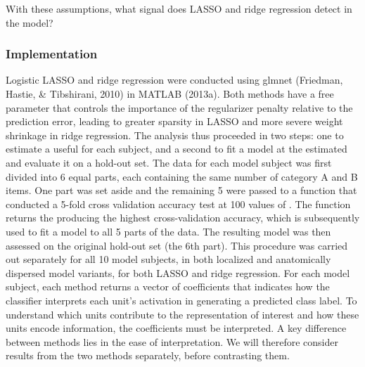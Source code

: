 With these assumptions, what signal does LASSO and ridge regression detect in the model?

\subsubsection{Implementation}
Logistic LASSO and ridge regression were conducted using glmnet (Friedman, Hastie, & Tibshirani, 2010) in MATLAB (2013a). Both methods have a free parameter \lambda that controls the importance of the regularizer penalty relative to the prediction error, leading to greater sparsity in LASSO and more severe weight shrinkage in ridge regression. The analysis thus proceeded in two steps: one to estimate a useful \lambda for each subject, and a second to fit a model at the estimated \lambda and evaluate it on a hold-out set. The data for each model subject was first divided into 6 equal parts, each containing the same number of category A and B items. One part was set aside and the remaining 5 were passed to a function that conducted a 5-fold cross validation accuracy test at 100 values of \lambda. The function returns the \lambda producing the highest cross-validation accuracy, which is subsequently used to fit a model to all 5 parts of the data. The resulting model was then assessed on the original hold-out set (the 6th part). This procedure was carried out separately for all 10 model subjects, in both localized and anatomically dispersed model variants, for both LASSO and ridge regression. For each model subject, each method returns a vector of coefficients that indicates how the classifier interprets each unit's activation in generating a predicted class label. To understand which units contribute to the representation of interest and how these units encode information, the coefficients must be interpreted. A key difference between methods lies in the ease of interpretation. We will therefore consider results from the two methods separately, before contrasting them.

